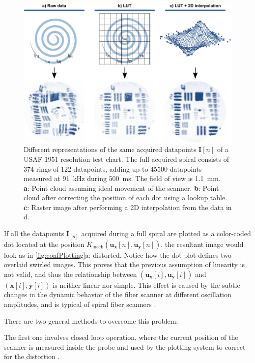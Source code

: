 \begin{figure}[h!]\centering \includegraphics{figures/50_Measurements/conf/proc/Plotting.pdf}
      \caption{Different representations of the same acquired datapoints $\mathbf{I}[n]$ of a USAF 1951 resolution test chart. The full acquired spiral consists of 374 rings of 122 datapoints, adding up to 45500 datapoints measured at \SI{91}{\kilo\hertz} during \SI{500}{\milli\second}. The field of view is \SI{1.1}{\milli\meter}.\\
      \textbf{a}: Point cloud assuming ideal movement of the scanner.
      \textbf{b}: Point cloud after correcting the position of each dot using a lookup table.
      \textbf{c}: Raster image after performing a 2D interpolation from the data in d.}
      \label{fig:confPlotting}
\end{figure}

If all the datapoints $\mathbf{I}_{[n]}$ acquired during a full spiral are plotted as a color-coded dot located at the position $K_\mathrm{mech}(\mathbf{u_x}[n], \mathbf{u_y}[n])$, the resultant image would look as in \autoref{fig:confPlotting}a: distorted. Notice how the dot plot defines two overlaid swirled images. This proves that the previous assumption of linearity is not valid, and thus the relationship between $(\mathbf{u_x}[i], \mathbf{u_y}[i])$ and $(\mathbf{x}[i], \mathbf{y}[i])$ is neither linear nor simple. This effect is caused by the subtle changes in the dynamic behavior of the fiber scanner at different oscillation amplitudes, and is typical of spiral fiber scanners \cite{Seibel2006}.

There are two general methods to overcome this problem:

The first one involves closed loop operation, where the current position of the scanner is measured inside the probe and used by the plotting system to correct for the distortion \cite{Yeoh2014}. 


